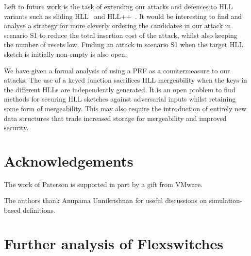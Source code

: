 \documentclass[sigconf, anonymous, dvipsnames]{acmart} %
\begin{document}
Left to future work is the task of extending our attacks and defences to HLL variants such as sliding HLL~\cite{slidinghll} and HLL++~\cite{hllpractice}. It would be interesting to find and analyse a strategy for more cleverly ordering the candidates in our attack in scenario S1 to reduce the total insertion cost of the attack, whilst also keeping the number of resets low. Finding an attack in scenario S1 when the target HLL sketch is initially non-empty is also open.

We have given a formal analysis of using a PRF as a countermeasure to our attacks. The use of a keyed function sacrifices HLL mergeability when the keys in the different HLLs are independently generated. It is an open problem to find methods for securing HLL sketches against adversarial inputs whilst retaining some form of mergeability. This may also require the introduction of entirely new data structures that trade increased storage for mergeability and improved security. 


\ifanon
\else
\section*{Acknowledgements}
The work of Paterson is supported in part by a gift from VMware.

The authors thank Anupama Unnikrishnan for useful discussions on simulation-based definitions.
\fi




\appendix

\section{Further analysis of Flexswitches}\label{sec:flexswitch}
\end{document}
